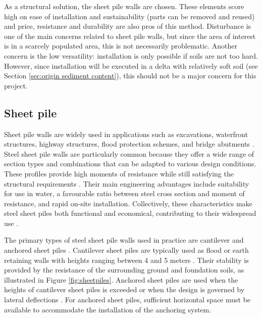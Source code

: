 As a structural solution, the sheet pile walls are chosen. These elements score high on ease of installation and sustainability (parts can be removed and reused) and price, resistance and durability are also pros of this method. Disturbance is one of the main concerns related to sheet pile walls, but since the area of interest is in a scarcely populated area, this is not necessarily problematic. Another concern is the low versatility: installation is only possible if soils are not too hard. However, since installation will be executed in a delta with relatively soft soil (see Section \ref{sec:origin sediment content}), this should not be a major concern for this project.

\subsection{Sheet pile}
\label{section:sheet_pile_wall}

Sheet pile walls are widely used in applications such as excavations, waterfront structures, highway structures, flood protection schemes, and bridge abutments \autocite{grabeSheetPilingHandbook2008}. Steel sheet pile walls are particularly common because they offer a wide range of section types and combinations that can be adapted to various design conditions. These profiles provide high moments of resistance while still satisfying the structural requirements \autocite{grabeSheetPilingHandbook2008}. Their main engineering advantages include suitability for use in water, a favourable ratio between steel cross section and moment of resistance, and rapid on-site installation. Collectively, these characteristics make steel sheet piles both functional and economical, contributing to their widespread use \autocite{grabeSheetPilingHandbook2008}.

The primary types of steel sheet pile walls used in practice are cantilever and anchored sheet piles \autocite{brownDesignSheetPile1994}. Cantilever sheet piles are typically used as flood or earth retaining walls with heights ranging between 4 and 5 meters \autocite{baxterPilingHandbook2022}. Their stability is provided by the resistance of the surrounding ground and foundation soils, as illustrated in Figure \ref{fig:sheetpiles}. Anchored sheet piles are used when the heights of cantilever sheet piles is exceeded or when the design is governed by lateral deflections \autocite{brownDesignSheetPile1994}. For anchored sheet piles, sufficient horizontal space must be available to accommodate the installation of the anchoring system.

